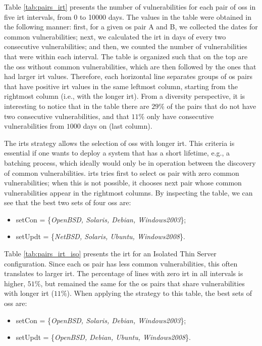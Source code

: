 Table \ref{tab:pairs_irt} presents the number of vulnerabilities for each pair of \glspl{os} in five \gls{irt} intervals, from 0 to 10000 days.
The values in the table were obtained in the following manner: first, for a given \gls{os} pair A and B, we collected the dates for common vulnerabilities; next, we calculated the \gls{irt} in days of every two consecutive vulnerabilities; and then, we counted the number of vulnerabilities that were within each interval.
The table is organized such that on the top are the \glspl{os} without common vulnerabilities, which are then followed by the ones that had larger \gls{irt} values. 
Therefore, each horizontal line separates groups of \gls{os} pairs that have positive \gls{irt} values in the same leftmost column, starting from the rightmost column (i.e., with the longer \gls{irt}). 
From a diversity perspective, it is interesting to notice that in the table there are $29\%$ of the pairs that do not have two consecutive vulnerabilities, and that $11\%$ only have consecutive vulnerabilities from $1000$ days on (last column).

The \gls{irts} strategy allows the selection of \glspl{os} with longer \gls{irt}. 
This criteria is essential if one wants to deploy a system that has a short lifetime, e.g., a batching process, which ideally would only be in operation between the discovery of common vulnerabilities. 
\gls{irts} tries first to select \gls{os} pair with zero common vulnerabilities; when this is not possible, it chooses next pair whose common vulnerabilities appear in the rightmost columns. 
By inspecting the table, we can see that the best two sets of four \glspl{os} are:

\begin{itemize}
\item setCon = \{\emph{OpenBSD, Solaris, Debian, Windows2003}\};
\item setUpdt = \{\emph{NetBSD, Solaris, Ubuntu, Windows2008}\}.
\end{itemize}


Table \ref{tab:pairs_irt_iso} presents the \gls{irt} for an Isolated Thin Server configuration. 
Since each \gls{os} pair has less common vulnerabilities, this often translates to larger \gls{irt}.  
The percentage of lines with zero \gls{irt} in all intervals is higher, $51\%$, but remained the same for the \gls{os} pairs that share vulnerabilities with longer \gls{irt} ($11\%$). 
When applying the strategy to this table, the best sets of \glspl{os} are: 

\begin{itemize}
\item setCon = \{\emph{OpenBSD, Solaris, Debian, Windows2003}\};
\item setUpdt = \{\emph{OpenBSD, Debian, Ubuntu, Windows2008}\}.
\end{itemize}


